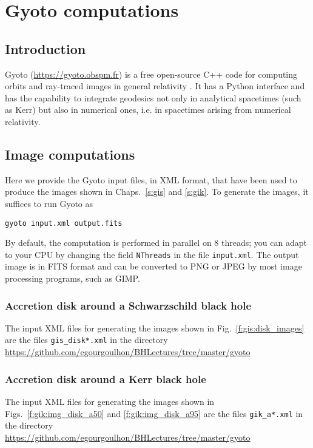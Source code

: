 \chapter{Gyoto computations} \label{s:gyo}

\minitoc

\section{Introduction}


\textsf{Gyoto} (\url{https://gyoto.obspm.fr}) is a free open-source
C++ code for computing orbits and ray-traced images in general relativity
\cite{VincePGP11}.
It has a Python interface and has the capability to integrate geodesics
not only in analytical spacetimes (such as Kerr) but also
in numerical ones, i.e. in spacetimes arising from numerical relativity.


\section{Image computations}

Here we provide the \textsf{Gyoto} input files, in XML format, that have been
used to produce the images shown in Chaps.~\ref{s:gis} and \ref{s:gik}.
To generate the images, it suffices to run \textsf{Gyoto} as
\begin{center}
\verb+gyoto input.xml output.fits+
\end{center}
By default, the computation is performed in parallel on 8 threads; you can
adapt to your CPU by changing the field \texttt{NThreads} in the file
\texttt{input.xml}. The output image is in FITS format and can be converted
to PNG or JPEG by most image processing programs, such as \textsf{GIMP}.

\subsection{Accretion disk around a Schwarzschild black hole} \label{s:gyo:Schwarz}

The input XML files for generating the images shown in Fig.~\ref{f:gis:disk_images}
are the files \verb+gis_disk*.xml+ in the directory\\
\url{https://github.com/egourgoulhon/BHLectures/tree/master/gyoto}


\subsection{Accretion disk around a Kerr black hole} \label{s:gyo:Kerr}

The input XML files for generating the images shown in Figs.~\ref{f:gik:img_disk_a50}
and \ref{f:gik:img_disk_a95}
are the files \verb+gik_a*.xml+ in the directory\\
\url{https://github.com/egourgoulhon/BHLectures/tree/master/gyoto}

